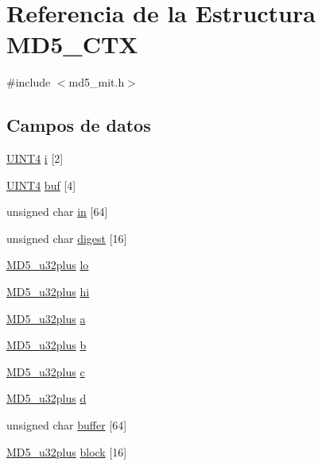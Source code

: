 \hypertarget{struct_m_d5___c_t_x}{}\section{Referencia de la Estructura M\+D5\+\_\+\+C\+T\+X}
\label{struct_m_d5___c_t_x}


{\ttfamily \#include $<$md5\+\_\+mit.\+h$>$}

\subsection*{Campos de datos}
\begin{DoxyCompactItemize}
\item 
\hyperlink{md5__mit_8h_acbcd3749ac28f52e756e22d22022cae5}{U\+I\+N\+T4} \hyperlink{struct_m_d5___c_t_x_aa94c7f6cf6c16dd45ecbf7be4af32f0c}{i} \mbox{[}2\mbox{]}
\item 
\hyperlink{md5__mit_8h_acbcd3749ac28f52e756e22d22022cae5}{U\+I\+N\+T4} \hyperlink{struct_m_d5___c_t_x_a7dc178b045dfbd504687dc9b0834d1d6}{buf} \mbox{[}4\mbox{]}
\item 
unsigned char \hyperlink{struct_m_d5___c_t_x_a3a40a33a5c6b34a5d53569057cbe8c4c}{in} \mbox{[}64\mbox{]}
\item 
unsigned char \hyperlink{struct_m_d5___c_t_x_a9c185c9970b81e602c4374ffe2c117e8}{digest} \mbox{[}16\mbox{]}
\item 
\hyperlink{md5_8c_ad854d8865ff7e0ce3717676b84926f54}{M\+D5\+\_\+u32plus} \hyperlink{struct_m_d5___c_t_x_ab6f070d5d937f16cddb2d666c32fdb8e}{lo}
\item 
\hyperlink{md5_8c_ad854d8865ff7e0ce3717676b84926f54}{M\+D5\+\_\+u32plus} \hyperlink{struct_m_d5___c_t_x_ad674a11709e105451f48b99b9fe54792}{hi}
\item 
\hyperlink{md5_8c_ad854d8865ff7e0ce3717676b84926f54}{M\+D5\+\_\+u32plus} \hyperlink{struct_m_d5___c_t_x_ac5629798efe5fb7cbd33911a77672275}{a}
\item 
\hyperlink{md5_8c_ad854d8865ff7e0ce3717676b84926f54}{M\+D5\+\_\+u32plus} \hyperlink{struct_m_d5___c_t_x_ae7735a3daa065dc9dfab9dd1a512d557}{b}
\item 
\hyperlink{md5_8c_ad854d8865ff7e0ce3717676b84926f54}{M\+D5\+\_\+u32plus} \hyperlink{struct_m_d5___c_t_x_a1f90d3ede1c4253a90685d1260482dfc}{c}
\item 
\hyperlink{md5_8c_ad854d8865ff7e0ce3717676b84926f54}{M\+D5\+\_\+u32plus} \hyperlink{struct_m_d5___c_t_x_a42be18d895cf7be9097073faf66734c1}{d}
\item 
unsigned char \hyperlink{struct_m_d5___c_t_x_a59e96eea04541ecd67c3faca41b13feb}{buffer} \mbox{[}64\mbox{]}
\item 
\hyperlink{md5_8c_ad854d8865ff7e0ce3717676b84926f54}{M\+D5\+\_\+u32plus} \hyperlink{struct_m_d5___c_t_x_ad8cb52dd70ac5316564b1e4b48b0ad7d}{block} \mbox{[}16\mbox{]}
\end{DoxyCompactItemize}


